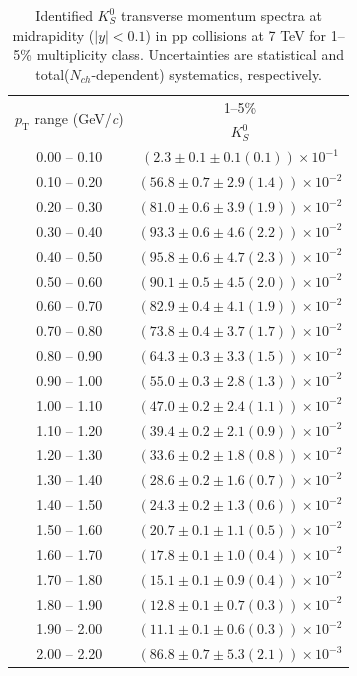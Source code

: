 \begin{table}
\caption{Identified $K^{0}_{S}$ transverse momentum spectra at midrapidity ($|y|<0.1$) in pp collisions at 7 TeV for 1--5\% multiplicity class. Uncertainties are statistical and total($N_{ch}$-dependent) systematics, respectively.}
\label{tab:K0Short_1to5}
\begin{center}
\begin{tabular}{ c | c }
\hline
\multirow{2}{*}{$p_{\mathrm{T}}$ range (GeV/\textit{c})} & \multicolumn{1}{c}{1--5\%} \\ & $K^{0}_{S}$\\ 
\hline
0.00 -- 0.10 & $(2.3\pm0.1\pm0.1(0.1))\times10^{-1}$ \\ 
0.10 -- 0.20 & $(56.8\pm0.7\pm2.9(1.4))\times10^{-2}$ \\ 
0.20 -- 0.30 & $(81.0\pm0.6\pm3.9(1.9))\times10^{-2}$ \\ 
0.30 -- 0.40 & $(93.3\pm0.6\pm4.6(2.2))\times10^{-2}$ \\ 
0.40 -- 0.50 & $(95.8\pm0.6\pm4.7(2.3))\times10^{-2}$ \\ 
0.50 -- 0.60 & $(90.1\pm0.5\pm4.5(2.0))\times10^{-2}$ \\ 
0.60 -- 0.70 & $(82.9\pm0.4\pm4.1(1.9))\times10^{-2}$ \\ 
0.70 -- 0.80 & $(73.8\pm0.4\pm3.7(1.7))\times10^{-2}$ \\ 
0.80 -- 0.90 & $(64.3\pm0.3\pm3.3(1.5))\times10^{-2}$ \\ 
0.90 -- 1.00 & $(55.0\pm0.3\pm2.8(1.3))\times10^{-2}$ \\ 
1.00 -- 1.10 & $(47.0\pm0.2\pm2.4(1.1))\times10^{-2}$ \\ 
1.10 -- 1.20 & $(39.4\pm0.2\pm2.1(0.9))\times10^{-2}$ \\ 
1.20 -- 1.30 & $(33.6\pm0.2\pm1.8(0.8))\times10^{-2}$ \\ 
1.30 -- 1.40 & $(28.6\pm0.2\pm1.6(0.7))\times10^{-2}$ \\ 
1.40 -- 1.50 & $(24.3\pm0.2\pm1.3(0.6))\times10^{-2}$ \\ 
1.50 -- 1.60 & $(20.7\pm0.1\pm1.1(0.5))\times10^{-2}$ \\ 
1.60 -- 1.70 & $(17.8\pm0.1\pm1.0(0.4))\times10^{-2}$ \\ 
1.70 -- 1.80 & $(15.1\pm0.1\pm0.9(0.4))\times10^{-2}$ \\ 
1.80 -- 1.90 & $(12.8\pm0.1\pm0.7(0.3))\times10^{-2}$ \\ 
1.90 -- 2.00 & $(11.1\pm0.1\pm0.6(0.3))\times10^{-2}$ \\ 
2.00 -- 2.20 & $(86.8\pm0.7\pm5.3(2.1))\times10^{-3}$ \\ 

\end{tabular}
\end{center}
\end{table}
